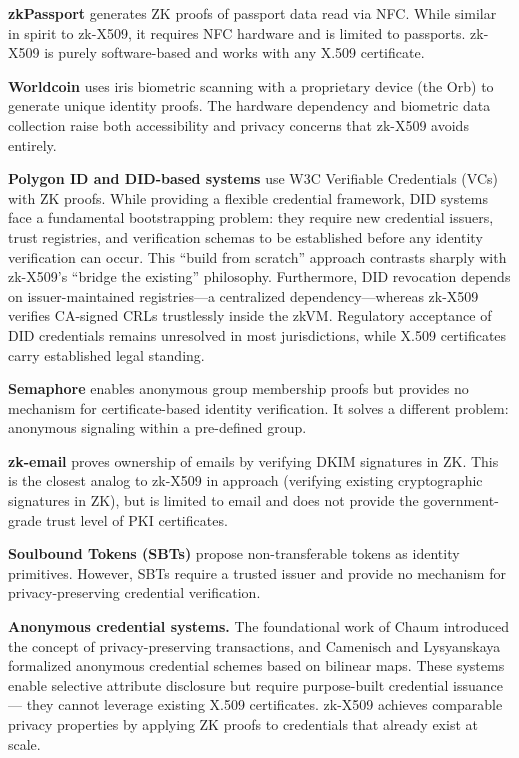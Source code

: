 \documentclass[11pt, a4paper]{article}
\begin{document}
\textbf{zkPassport} \cite{ref2} generates ZK proofs of passport data read
via NFC. While similar in spirit to zk-X509, it requires NFC hardware
and is limited to passports. zk-X509 is purely software-based and works
with any X.509 certificate.

\textbf{Worldcoin} \cite{ref3} uses iris biometric scanning with a
proprietary device (the Orb) to generate unique identity proofs. The
hardware dependency and biometric data collection raise both
accessibility and privacy concerns that zk-X509 avoids entirely.

\textbf{Polygon ID and DID-based systems} \cite{ref13, ref33} use W3C Verifiable
Credentials (VCs) with ZK proofs. While providing a flexible credential
framework, DID systems face a fundamental bootstrapping problem: they
require new credential issuers, trust registries, and verification
schemas to be established before any identity verification can occur.
This ``build from scratch'' approach contrasts sharply with zk-X509's
``bridge the existing'' philosophy. Furthermore, DID revocation depends
on issuer-maintained registries---a centralized dependency---whereas
zk-X509 verifies CA-signed CRLs trustlessly inside the zkVM. Regulatory
acceptance of DID credentials remains unresolved in most jurisdictions,
while X.509 certificates carry established legal standing.

\textbf{Semaphore} \cite{ref8} enables anonymous group membership proofs but
provides no mechanism for certificate-based identity verification. It
solves a different problem: anonymous signaling within a pre-defined
group.

\textbf{zk-email} \cite{ref9} proves ownership of emails by verifying DKIM
signatures in ZK. This is the closest analog to zk-X509 in approach
(verifying existing cryptographic signatures in ZK), but is limited to
email and does not provide the government-grade trust level of PKI
certificates.

\textbf{Soulbound Tokens (SBTs)} \cite{ref10} propose non-transferable
tokens as identity primitives. However, SBTs require a trusted issuer
and provide no mechanism for privacy-preserving credential verification.

\textbf{Anonymous credential systems.} The foundational work of Chaum
\cite{ref19} introduced the concept of privacy-preserving transactions, and
Camenisch and Lysyanskaya \cite{ref18} formalized anonymous credential
schemes based on bilinear maps. These systems enable selective attribute
disclosure but require purpose-built credential issuance --- they cannot
leverage existing X.509 certificates. zk-X509 achieves comparable
privacy properties by applying ZK proofs to credentials that already
exist at scale.
\end{document}
